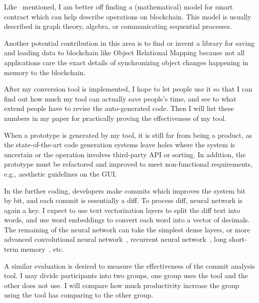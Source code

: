 Like~\cite{tolmach2021survey} mentioned, I am better off finding a (mathematical) model for smart contract which can help describe operations on blockchain. This model is usually described in graph theory, algebra, or communicating sequential processes.

Another potential contribution in this area is to find or invent a library for saving and loading data to blockchain like Object Relational Mapping because
not all applications care the exact details of synchronizing object changes happening in memory to the blockchain.


After my conversion tool is implemented, I hope to let people use it so that I can find out how much my tool can actually save people's time, and see to what extend people have to revise the auto-generated code. Then I will list these numbers in my paper for practically proving the effectiveness of my tool.

When a prototype is generated by my tool, it is still far from being a product, as the state-of-the-art code generation systems leave holes where the system is uncertain or the operation involves  third-party API or sorting. In addition, the prototype must be refactored and improved to meet non-functional requirements, e.g., aesthetic guidelines on the GUI.

In the further coding, developers make commits which improves the system bit by bit, and each commit is essentially a diff. To process diff, neural network is again a key. I expect to use text vectorization layers to split the diff text into words, and use word embeddings to convert each word into a vector of decimals.
The remaining of the neural network can take the simplest dense layers, or more advanced convolutional neural network~\cite{albawi2017understanding}, recurrent neural network~\cite{tarwani2017survey}, long short-term memory~\cite{skovajsova2017long}, etc.

A similar evaluation is desired to measure the effectiveness of the commit analysis tool. I may divide participants into two groups, one group uses the tool and the other does not use. I will compare how much productivity increase the group using the tool has comparing to the other group.


